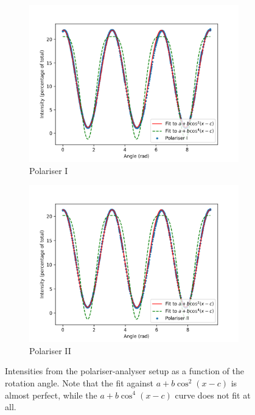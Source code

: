 \documentclass[11pt]{article}
\begin{document}
        \begin{figure}[H]
        \begin{subfigure}[b]{0.50\textwidth}
                \includegraphics[width=1.1\textwidth]{./pol_1.png}
                \caption{Polariser I}
        \end{subfigure}
        \begin{subfigure}[b]{0.50\textwidth}
                \includegraphics[width=1.1\textwidth]{./pol_2.png}
                \caption{Polariser II}
        \end{subfigure}
        \caption{Intensities from the polariser-analyser setup as a function of the rotation angle. Note that the fit against $a + b\cos^2(x - c)$
        is almost perfect, while the $a + b\cos^4(x - c)$ curve does not fit at all.}
        \label{fig:polarisers}
        \end{figure}
\end{document}
